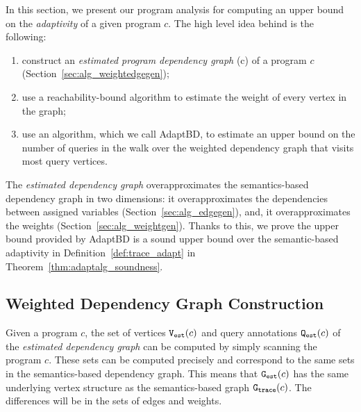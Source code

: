 In this section, we present our program analysis {\THESYSTEM} for
computing an upper bound on the \emph{adaptivity} of a given program
$c$.
%
 The high level idea behind {\THESYSTEM} is the following:
  \begin{enumerate}
    \item construct
    an \emph{estimated program dependency graph} \progG(c) of a program $c$
    (Section~\ref{sec:alg_weightedgegen});
    \item use a reachability-bound algorithm to estimate the weight of every vertex in the graph;
    \item  use an algorithm, which we call AdaptBD, to estimate an upper bound on the number of queries in the walk over the weighted dependency graph that visits most query vertices. %
  \end{enumerate}
  The \emph{estimated dependency graph} overapproximates the
  semantics-based dependency graph in two dimensions: it
  overapproximates the dependencies between assigned variables (Section~\ref{sec:alg_edgegen}), and, it
  overapproximates the weights (Section~\ref{sec:alg_weightgen}). Thanks to this, 
 we prove the upper bound provided by AdaptBD is a sound upper bound
  over the semantic-based adaptivity in Definition~\ref{def:trace_adapt} in Theorem~\ref{thm:adaptalg_soundness}.  

%
%
\subsection{Weighted Dependency Graph Construction}
Given a program $c$, the set of vertices $\mathtt{{V_{est}}}(c)$ and query annotations $\mathtt{{Q_{est}}}(c)$ of the \emph{estimated dependency graph} can be computed by simply
scanning the program $c$. These sets can be computed precisely and correspond to
the same sets in the semantics-based dependency graph.
This means that $\mathtt{{G_{est}}}(c)$ has the same underlying vertex structure as 
the semantics-based graph $\mathtt{{G_{trace}}}(c)$. The differences will be in the sets of edges and weights. 





